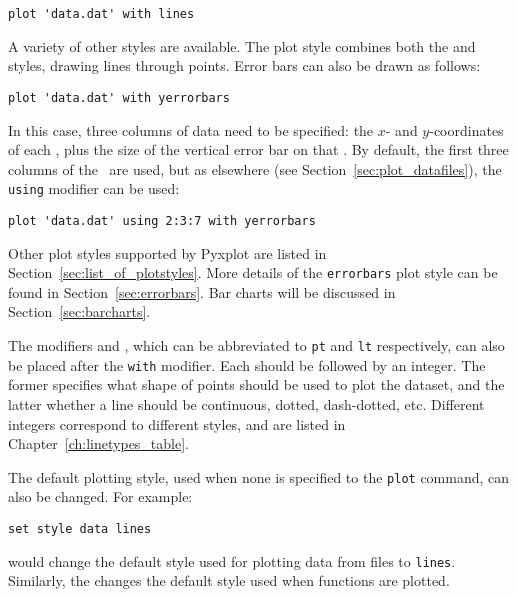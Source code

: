 \begin{verbatim}
plot 'data.dat' with lines
\end{verbatim}

A variety of other styles are available. The  plot style
combines both the  and  styles, drawing lines
through points. Error bars can also be drawn as follows:

\begin{verbatim}
plot 'data.dat' with yerrorbars
\end{verbatim}

\noindent In this case, three columns of data need to be specified: the $x$-
and $y$-coordinates of each \datapoint, plus the size of the vertical error bar
on that \datapoint. By default, the first three columns of the \datafile\ are
used, but as elsewhere (see Section~\ref{sec:plot_datafiles}), the {\tt using}
modifier can be used:

\begin{verbatim}
plot 'data.dat' using 2:3:7 with yerrorbars
\end{verbatim}

Other plot styles supported by Pyxplot are listed in
Section~\ref{sec:list_of_plotstyles}.  More details of the {\tt errorbars} plot
style can be found in Section~\ref{sec:errorbars}. Bar charts will be discussed
in Section~\ref{sec:barcharts}.

\label{sec:pointtype}
The modifiers  and , which can be
abbreviated to {\tt pt} and {\tt lt} respectively, can also be placed after the
{\tt with} modifier. Each should be followed by an integer.  The former
specifies what shape of points should be used to plot the dataset, and the
latter whether a line should be continuous, dotted, dash-dotted, etc.
Different integers correspond to different styles, and are listed in
Chapter~\ref{ch:linetypes_table}.

The default plotting style, used when none is specified to the {\tt plot}
command, can also be changed.  For example:

\begin{verbatim}
set style data lines
\end{verbatim}

\noindent would change the default style used for plotting data from files to
{\tt lines}. Similarly, the  changes the default
style used when functions are plotted.

